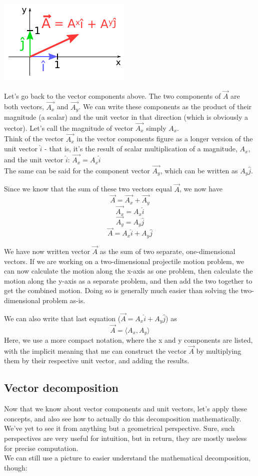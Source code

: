 \documentclass[8.01x]{subfiles}
\begin{document}
\includegraphics[scale=1.6]{Graphics/vectors/unitvectors}

Let's go back to the vector components above. The two components of $\vec{A}$ are both vectors, $\vec{A_x}$ and $\vec{A_y}$. We can write these components as the product of their magnitude (a scalar) and the unit vector in that direction (which is obviously a vector). Let's call the magnitude of vector $\vec{A_x}$  simply $A_x$.\\
Think of the vector $\vec{A_x}$ in the vector components figure as a longer version of the unit vector $\hat{i}$ - that is, it's the result of scalar multiplication of a magnitude, $A_x$, and the unit vector $\hat{i}$: $\vec{A_x} = A_x \hat{i}$\\
The same can be said for the component vector $\vec{A_y}$, which can be written as $A_y \hat{j}$.

Since we know that the sum of these two vectors equal $\vec{A}$, we now have
\[ \vec{A} = \vec{A_x} + \vec{A_y} \]
\[ \vec{A_x} = A_x \hat{i} \]
\[ \vec{A_y} = A_y \hat{j} \]
\[ \vec{A} = A_x \hat{i} + A_y \hat{j} \]

We have now written vector $\vec{A}$ as the sum of two separate, one-dimensional vectors. If we are working on a two-dimensional projectile motion problem, we can now calculate the motion along the x-axis as one problem, then calculate the motion along the y-axis as a separate problem, and then add the two together to get the combined motion. Doing so is generally much easier than solving the two-dimensional problem as-is.

We can also write that last equation ($\vec{A} = A_x \hat{i} + A_y \hat{j}$) as
\[ \vec{A} = \langle A_x, A_y \rangle \]
Here, we use a more compact notation, where the x and y components are listed, with the implicit meaning that me can construct the vector $\vec{A}$ by multiplying them by their respective unit vector, and adding the results.


\subsection{Vector decomposition}
Now that we know about vector components and unit vectors, let's apply these concepts, and also see how to actually do this decomposition mathematically. We've yet to see it from anything but a geometrical perspective. Sure, such perspectives are very useful for intuition, but in return, they are mostly useless for precise computation.\\
We can still use a picture to easier understand the mathematical decomposition, though:
\end{document}
